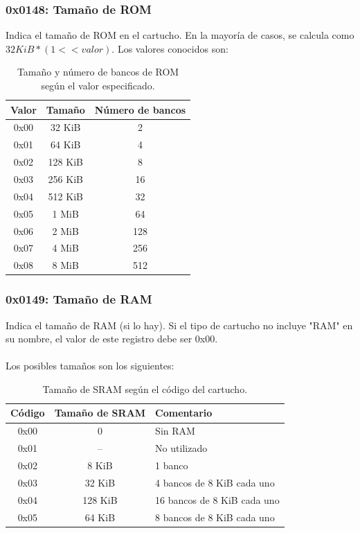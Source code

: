 \subsubsection{0x0148: Tamaño de ROM}
Indica el tamaño de ROM en el cartucho. En la mayoría de casos, se calcula como $32 KiB * (1 << valor)$. Los valores conocidos son:

\begin{table}[h]
    \centering
    \begin{tabular}{|c|c|c|}
        \hline
        \textbf{Valor} & \textbf{Tamaño} & \textbf{Número de bancos} \\
        \hline
        0x00 & 32 KiB & 2 \\ \hline
        0x01 & 64 KiB & 4 \\ \hline
        0x02 & 128 KiB & 8 \\ \hline
        0x03 & 256 KiB & 16 \\ \hline
        0x04 & 512 KiB & 32 \\ \hline
        0x05 & 1 MiB & 64 \\ \hline
        0x06 & 2 MiB & 128 \\ \hline
        0x07 & 4 MiB & 256 \\ \hline
        0x08 & 8 MiB & 512 \\ \hline
    \end{tabular}
    \caption{Tamaño y número de bancos de ROM según el valor especificado.}
    \label{tab:rom_size_banks}
\end{table}

\subsubsection{0x0149: Tamaño de RAM}
Indica el tamaño de RAM (si lo hay). Si el tipo de cartucho no incluye "RAM" en su nombre, el valor de este registro debe ser 0x00. 
\\\\
Los posibles tamaños son los siguientes:

\begin{table}[H]
    \centering
    \begin{tabular}{|c|c|l|}
        \hline
        \textbf{Código} & \textbf{Tamaño de SRAM} & \textbf{Comentario} \\ \hline
        0x00 & 0 & Sin RAM \\ \hline
        0x01 & – & No utilizado \\ \hline
        0x02 & 8 KiB & 1 banco \\ \hline
        0x03 & 32 KiB & 4 bancos de 8 KiB cada uno \\ \hline
        0x04 & 128 KiB & 16 bancos de 8 KiB cada uno \\ \hline
        0x05 & 64 KiB & 8 bancos de 8 KiB cada uno \\ \hline
    \end{tabular}
    \caption{Tamaño de SRAM según el código del cartucho.}
    \label{tab:sram_size}
\end{table}

